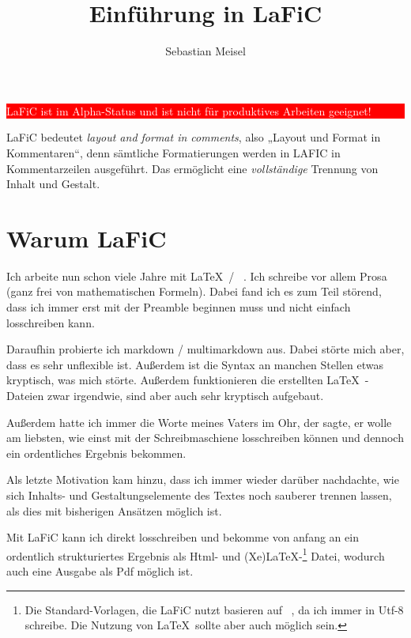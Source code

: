 \documentclass{scrartcl}
\title{Einführung in LaFiC}
\author{Sebastian Meisel}
\begin{document}
\maketitle


\colorbox{red}{\parbox{\linewidth}{%
\begin{center}
\textcolor{white}{%
LaFiC ist im Alpha-Status und ist nicht für produktives Arbeiten geeignet!}
\end{center}

}
}

{LaFiC bedeutet \textit{layout and format in comments}, also „Layout
und Format in Kommentaren“, denn sämtliche Formatierungen
werden in LAFIC in Kommentarzeilen ausgeführt. Das
ermöglicht eine \emph{vollständige} Trennung von Inhalt und
Gestalt.\\}

\section{Warum LaFiC}

{Ich arbeite nun schon viele Jahre mit \LaTeX\  / \XeLaTeX\ . Ich
schreibe vor allem Prosa (ganz frei von mathematischen
Formeln). Dabei fand ich es zum Teil störend, dass ich immer
erst mit der Preamble beginnen muss und nicht einfach
losschreiben kann.\\}

{Daraufhin probierte ich markdown / multimarkdown aus. Dabei
störte mich aber, dass es sehr unflexible ist. Außerdem ist
die Syntax an manchen Stellen etwas kryptisch, was mich
störte. Außerdem funktionieren die erstellten \LaTeX\ -Dateien
zwar irgendwie, sind aber auch sehr kryptisch aufgebaut.\\}

{Außerdem hatte ich immer die Worte meines Vaters im Ohr, der
sagte, er wolle am liebsten, wie einst mit der
Schreibmaschiene losschreiben können und dennoch ein
ordentliches Ergebnis bekommen.\\}

{Als letzte Motivation kam hinzu, dass ich immer wieder
darüber nachdachte, wie sich Inhalts- und
Gestaltungselemente des Textes noch sauberer trennen lassen,
als dies mit bisherigen Ansätzen möglich ist.\\}

{Mit LaFiC kann ich direkt losschreiben und bekomme von
anfang an ein ordentlich strukturiertes Ergebnis als Html-
und (Xe)LaTeX-\footnote{Die Standard-Vorlagen, die LaFiC nutzt basieren auf \XeLaTeX\ , da ich immer in Utf-8 schreibe. Die Nutzung von \LaTeX\  sollte aber auch möglich sein.}\xspace Datei, wodurch auch eine Ausgabe als Pdf
möglich ist.\\}
\end{document}
